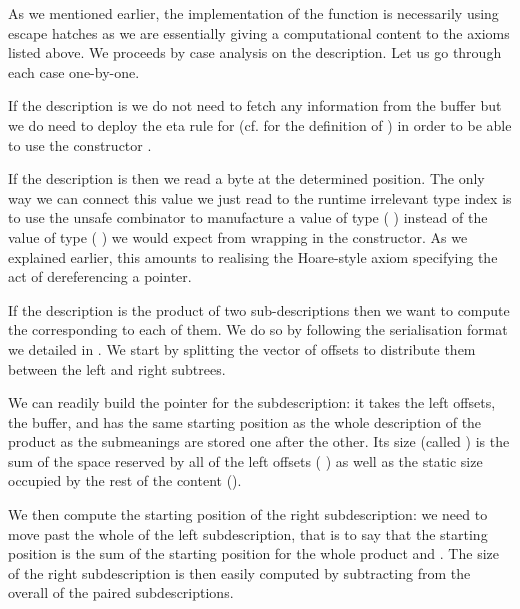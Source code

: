 As we mentioned earlier, the \idris{} implementation of the
 function
is necessarily using escape hatches as we are essentially
giving a computational content to the axioms listed above.
%
We proceeds by case analysis on the description.
%
Let us go through each case one-by-one.


If the description is  we do not need to fetch any
information from the buffer but we do need to deploy the eta rule
for  (cf.  for the definition
of )
in order to be able to use the 
constructor .


If the description is  then we read a byte at the
determined position. The only way we can connect this value we just
read to the runtime irrelevant type index is to use the unsafe combinator
 to manufacture a value of type
( ) instead of the value of type
( )
we would expect from wrapping  in the  constructor.
%
As we explained earlier, this amounts to realising the
Hoare-style axiom specifying the act of dereferencing a pointer.

If the description is the product of two sub-descriptions then we
want to compute the  corresponding to
each of them.
%
We do so by following the serialisation format we detailed in
.
%
We start by splitting the vector of offsets to distribute them between
the left and right subtrees.

We can readily build the pointer for the  subdescription:
it takes the left offsets, the buffer, and has the same starting position
as the whole description of the product as the submeanings are stored one after the other.
Its size (called ) is the sum of the space reserved
by all of the left offsets ( )
as well as the static size occupied by the rest of the content
().

We then compute the starting position of the right subdescription: we need to
move past the whole of the left subdescription, that is to say that the starting
position is the sum of the starting position for the whole product and .
%
The size of the right subdescription is then easily computed by subtracting
 from the overall  of the paired subdescriptions.


